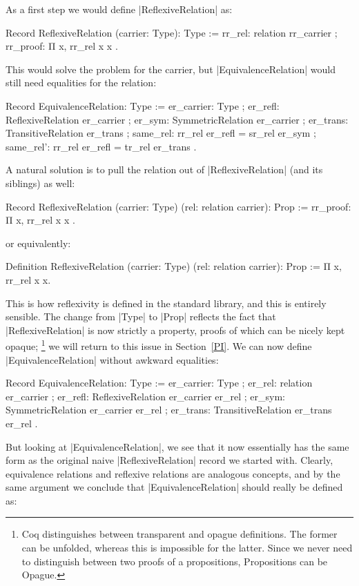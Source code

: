\documentclass[a4paper,10pt,runningheads]{llncs}
\begin{document}
As a first step we would define |ReflexiveRelation| as:
\begin{code}
  Record ReflexiveRelation (carrier: Type): Type :=
    { rr_rel: relation rr_carrier
    ; rr_proof: Π x, rr_rel x x }.
\end{code}

This would solve the problem for the carrier, but |EquivalenceRelation| would still need equalities
for the relation:
\begin{code}
  Record EquivalenceRelation: Type :=
    { er_carrier: Type
    ; er_refl: ReflexiveRelation er_carrier
    ; er_sym: SymmetricRelation er_carrier
    ; er_trans: TransitiveRelation er_trans
    ; same_rel: rr_rel er_refl = sr_rel er_sym
    ; same_rel': rr_rel er_refl = tr_rel er_trans }.
\end{code}

A natural solution is to pull the relation out of |ReflexiveRelation| (and its siblings) as well:
\begin{code}
  Record ReflexiveRelation (carrier: Type)
                           (rel: relation carrier): Prop :=
    { rr_proof: Π x, rr_rel x x }.
\end{code}
or equivalently:
\begin{code}
  Definition ReflexiveRelation (carrier: Type)
                               (rel: relation carrier): Prop :=
    Π x, rr_rel x x.
\end{code}
This is how reflexivity is defined in the standard library, and this is entirely sensible. The
change from |Type| to |Prop| reflects the fact that |ReflexiveRelation| is now strictly a property,
proofs of which can be nicely kept opaque;%
\footnote{Coq distinguishes between transparent and opague definitions. The former can be unfolded,
whereas this is impossible for the latter. Since we never need to distinguish between two proofs of
a propositions, Propositions can be Opague.}
we will return to this issue in Section~\ref{PI}.
We can now define |EquivalenceRelation| without awkward equalities:
\begin{code}
  Record EquivalenceRelation: Type :=
    { er_carrier: Type
    ; er_rel: relation er_carrier
    ; er_refl: ReflexiveRelation er_carrier er_rel
    ; er_sym: SymmetricRelation er_carrier er_rel
    ; er_trans: TransitiveRelation er_trans er_rel }.
\end{code}

But looking at |EquivalenceRelation|, we see that it now essentially has the same form as the
original naive |ReflexiveRelation| record we started with. Clearly, equivalence relations
and reflexive relations are analogous concepts, and by the same argument we
conclude that |EquivalenceRelation| should really be defined as:
\end{document}
